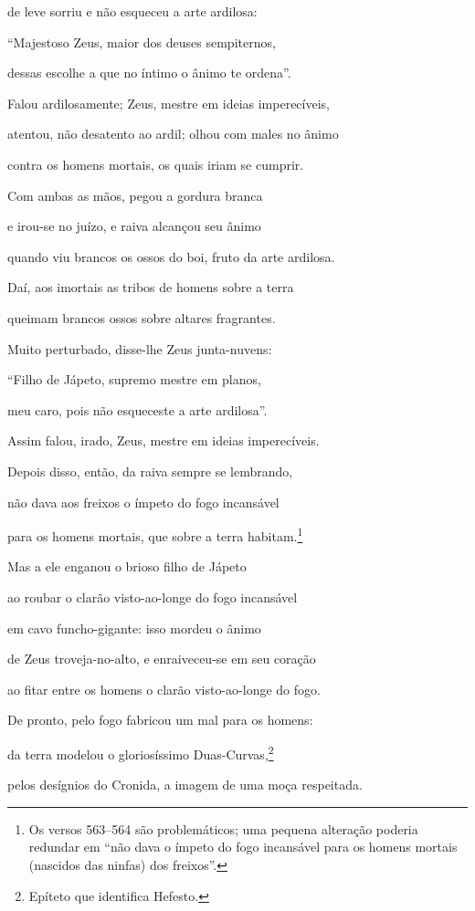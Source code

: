 \begin{pages}
\begin{Rightside}
de leve sorriu e não esqueceu a arte ardilosa:

``Majestoso Zeus, maior dos deuses sempiternos,

dessas escolhe a que no íntimo o ânimo te ordena''.

\quad{}Falou ardilosamente; Zeus, mestre em ideias imperecíveis, 

atentou, não desatento ao ardil; olhou com males no ânimo

contra os homens mortais, os quais iriam se cumprir.

Com ambas as mãos, pegou a gordura branca

e irou-se no juízo, e raiva alcançou seu ânimo

quando viu brancos os ossos do boi, fruto da arte ardilosa. 

Daí, aos imortais as tribos de homens sobre a terra

queimam brancos ossos sobre altares fragrantes.

\quad{}Muito perturbado, disse-lhe Zeus junta-nuvens:

``Filho de Jápeto, supremo mestre em planos,

meu caro, pois não esqueceste a arte ardilosa''. 

\quad{}Assim falou, irado, Zeus, mestre em ideias imperecíveis.

Depois disso, então, da raiva sempre se lembrando,

não dava aos freixos o ímpeto do fogo incansável

para os homens mortais, que sobre a terra habitam.\footnote{Os versos 563--564 são problemáticos; uma pequena alteração poderia redundar em
``não dava o ímpeto do fogo incansável para os homens mortais (nascidos
das ninfas) dos freixos''.}

Mas a ele enganou o brioso filho de Jápeto 

ao roubar o clarão visto-ao-longe do fogo incansável

em cavo funcho-gigante: isso mordeu o ânimo

de Zeus troveja-no-alto, e enraiveceu-se em seu coração

ao fitar entre os homens o clarão visto-ao-longe do fogo.

De pronto, pelo fogo fabricou um mal para os homens: 

da terra modelou o gloriosíssimo Duas-Curvas,\footnote{Epíteto que identifica Hefesto.}

pelos desígnios do Cronida, a imagem de uma moça respeitada.


\end{Rightside}
\end{pages}
